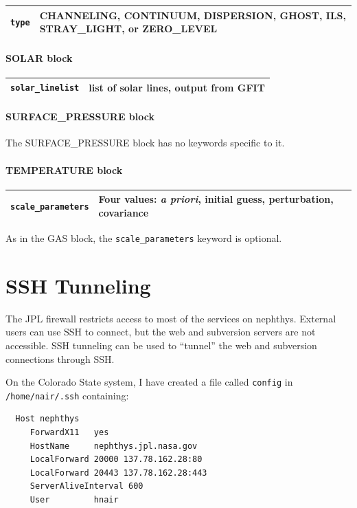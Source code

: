 \documentclass{article}
\begin{document}
\begin{tabular}{|l|p{3.75in}|}
\hline
\texttt{type} & CHANNELING, CONTINUUM, DISPERSION, GHOST, ILS, STRAY\_LIGHT, or ZERO\_LEVEL\\
\hline
\end{tabular}

\paragraph{SOLAR block}

\begin{tabular}{|l|p{3.75in}|}
\hline
\texttt{solar\_linelist} & list of solar lines, output from GFIT\\
\hline
\end{tabular}

\paragraph{SURFACE\_PRESSURE block}

The SURFACE\_PRESSURE block has no keywords specific to it.

\paragraph{TEMPERATURE block}

\begin{tabular}{|l|p{3.75in}|}
\hline
\texttt{scale\_parameters} & Four values: \textit{a priori}, initial guess, perturbation, covariance\\
\hline
\end{tabular}

As in the GAS block, the \texttt{scale\_parameters} keyword is optional.

\appendix

\section{SSH Tunneling}

The JPL firewall restricts access to most of the services on
nephthys.  External users can use SSH to connect, but the web and
subversion servers are not accessible.  SSH tunneling can be used to
``tunnel'' the web and subversion connections through SSH.

On the Colorado State system, I have created a file called
\texttt{config} in \texttt{/home/nair/.ssh} containing:

\begin{verbatim}
  Host nephthys
     ForwardX11   yes
     HostName     nephthys.jpl.nasa.gov
     LocalForward 20000 137.78.162.28:80
     LocalForward 20443 137.78.162.28:443
     ServerAliveInterval 600
     User         hnair
\end{verbatim}
\end{document}
